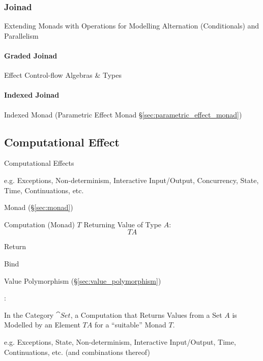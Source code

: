 \subsubsection{Joinad}\label{sec:joinad}

Extending Monads with Operations for Modelling Alternation
(Conditionals) and Parallelism



\paragraph{Graded Joinad}\label{sec:graded_joinad}\hfill

Effect Control-flow Algebras \& Types



\paragraph{Indexed Joinad}\label{sec:indexed_joinad}\hfill

Indexed Monad (Parametric Effect Monad
\S\ref{sec:parametric_effect_monad})



\subsection{Computational Effect}\label{sec:computational_effect}

Computational Effects

e.g. Exceptions, Non-determinism, Interactive Input/Output,
Concurrency, State, Time, Continuations, etc. \cite{plotkin-pretnar09}

Monad (\S\ref{sec:monad})

Computation (Monad) $T$ Returning Value of Type $A$:
\[
  T A
\]

Return

Bind

Value Polymorphism (\S\ref{sec:value_polymorphism})

\cite{plotkin-pretnar13}:

In the Category $\cat{Set}$, a Computation that Returns Values from a
Set $A$ is Modelled by an Element $T A$ for a ``suitable'' Monad $T$.

e.g. Exceptions, State, Non-determinism, Interactive Input/Output,
Time, Continuations, etc. (and combinations thereof)

